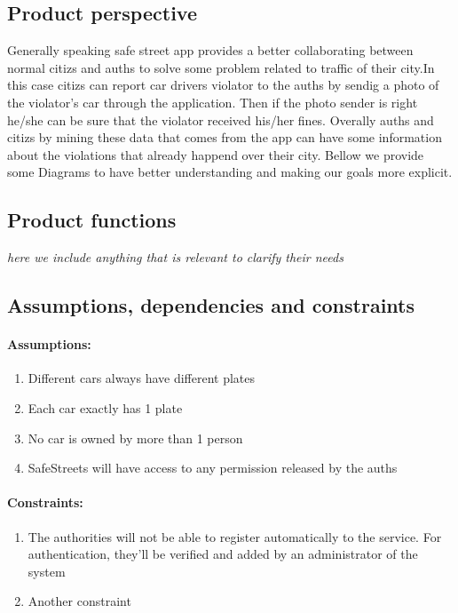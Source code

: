 \documentclass{article}
\newcommand{\enum}[1]{\texttt{#1.\arabic*}}
\begin{document}
	\subsection{Product perspective} Generally speaking safe street app provides a better collaborating between normal citizs and auths to solve some problem related to traffic of their city.In this case citizs can report car drivers violator to the auths by sendig a photo of the violator's car through the application. Then if the photo sender is right he/she can be sure that the violator received his/her fines. Overally auths and citizs by mining these data that comes from the app can have some information about the violations that already happend over their city. Bellow we provide some Diagrams to have better understanding and making our goals more explicit.  
	
	\subsection{Product functions}\textit{here we include anything that is relevant to clarify their needs}
	
	\subsection{Assumptions, dependencies and constraints}
	
	\paragraph{Assumptions:}
		\begin{enumerate}[label=\enum{A}]
			\item \label{A_disjPlates} Different cars always have different plates
			\item \label{A_Single plate}Each car exactly has 1 plate
			\item \label{A_singleOwner}No car is owned by more than 1 person
			\item \label{A_accessiblePermissions}SafeStreets will have access to any permission released by the auths
		\end{enumerate}
	
	\paragraph{Constraints:}
		\begin{enumerate}[label=\enum{C}]
			\item The authorities will not be able to register automatically to the service. For authentication, they'll be verified and added by an administrator of the system
			\item Another constraint
		\end{enumerate}
	
\end{document}
